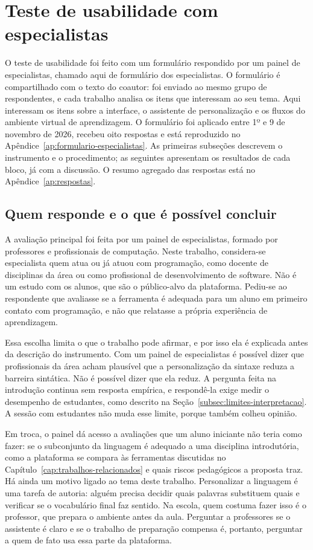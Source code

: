 \section{Teste de usabilidade com especialistas}
\label{sec:protocolo-avaliacao}\label{sec:avaliacao-especialistas}

O teste de usabilidade foi feito com um formulário respondido por um painel de especialistas, chamado aqui de formulário dos especialistas. O formulário é compartilhado com o texto do coautor: foi enviado ao mesmo grupo de respondentes, e cada trabalho analisa os itens que interessam ao seu tema. Aqui interessam os itens sobre a interface, o assistente de personalização e os fluxos do ambiente virtual de aprendizagem. O formulário foi aplicado entre 1º e 9 de novembro de 2026, recebeu oito respostas e está reproduzido no Apêndice~\ref{ap:formulario-especialistas}. As primeiras subseções descrevem o instrumento e o procedimento; as seguintes apresentam os resultados de cada bloco, já com a discussão. O resumo agregado das respostas está no Apêndice~\ref{ap:respostas}.

\subsection{Quem responde e o que é possível concluir}

A avaliação principal foi feita por um painel de especialistas, formado por professores e profissionais de computação. Neste trabalho, considera-se especialista quem atua ou já atuou com programação, como docente de disciplinas da área ou como profissional de desenvolvimento de software. Não é um estudo com os alunos, que são o público-alvo da plataforma. Pediu-se ao respondente que avaliasse se a ferramenta é adequada para um aluno em primeiro contato com programação, e não que relatasse a própria experiência de aprendizagem.

Essa escolha limita o que o trabalho pode afirmar, e por isso ela é explicada antes da descrição do instrumento. Com um painel de especialistas é possível dizer que profissionais da área acham plausível que a personalização da sintaxe reduza a barreira sintática. Não é possível dizer que ela reduz. A pergunta feita na introdução continua sem resposta empírica, e respondê-la exige medir o desempenho de estudantes, como descrito na Seção~\ref{subsec:limites-interpretacao}. A sessão com estudantes não muda esse limite, porque também colheu opinião.

Em troca, o painel dá acesso a avaliações que um aluno iniciante não teria como fazer: se o subconjunto da linguagem é adequado a uma disciplina introdutória, como a plataforma se compara às ferramentas discutidas no Capítulo~\ref{cap:trabalhos-relacionados} e quais riscos pedagógicos a proposta traz. Há ainda um motivo ligado ao tema deste trabalho. Personalizar a linguagem é uma tarefa de autoria: alguém precisa decidir quais palavras substituem quais e verificar se o vocabulário final faz sentido. Na escola, quem costuma fazer isso é o professor, que prepara o ambiente antes da aula. Perguntar a professores se o assistente é claro e se o trabalho de preparação compensa é, portanto, perguntar a quem de fato usa essa parte da plataforma.

